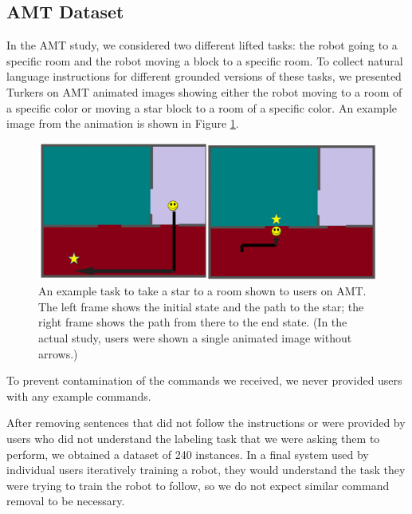 \documentclass[conference]{IEEEtran}
\begin{document}
\subsection{AMT Dataset}
In the AMT study, we considered two different lifted tasks: the robot going to a specific room and the robot moving a block to a specific room. To collect natural language instructions for different grounded versions of these tasks, we presented Turkers on AMT animated images showing either the robot moving to a room of a specific color or moving a star block to a room of a specific color. An example image from the animation is shown in Figure \ref{fig:animation}.
\begin{figure}[tp]
\begin{center}
\includegraphics[width=\columnwidth]{images/map1_2a}
\caption{\small An example task to take a star to a room shown to users on AMT. The left frame shows the initial state and the path to the star; the right frame shows the path from there to the end state. (In the actual study, users were shown a single animated image without arrows.)}
\label{fig:animation}
\end{center}
\end{figure}
To prevent contamination of the commands we received, we never provided users with any example commands. 

After removing sentences that did not follow the instructions or were provided by users who did not understand the labeling task that we were asking them to perform, we obtained a dataset of 240 instances. In a final system used by individual users iteratively training a robot, they would understand the task they were trying to train the robot to follow, so we do not expect similar command removal to be necessary.
\end{document}

